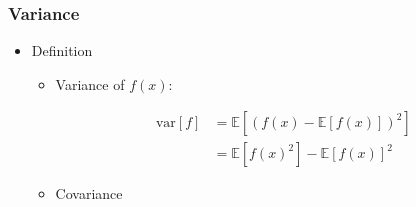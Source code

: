 \subsubsection{Variance}
\begin{itemize}
\item Definition
	\begin{itemize}
	\item Variance of $f(x)$:
		\begin{itemize}
		\Item \begin{align*} \text{var}[f] &= \mathbb{E}[(f(x) - \mathbb{E}[f(x)])^2] \\ &= \mathbb{E}[f(x)^2] - \mathbb{E}[f(x)]^2 \end{align*}
		\end{itemize}
	\item Covariance
	\end{itemize}
\end{itemize}

